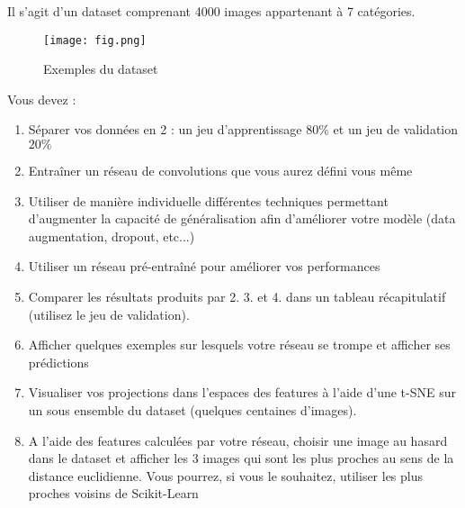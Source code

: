 \documentclass{article}
\begin{document}
Il s'agit d'un dataset comprenant 4000 images appartenant à 7 catégories.

\begin{figure}
    \centering
    \texttt{[image: fig.png]}
    \caption{Exemples du dataset}
    \label{fig:fig}
\end{figure}


Vous devez :

\begin{enumerate}
    \item Séparer vos données en 2 : un jeu d'apprentissage $80 \%$ et un jeu de validation $20 \%$

    \item Entraîner un réseau de convolutions que vous aurez défini vous même

    \item Utiliser de manière individuelle différentes techniques permettant d'augmenter la capacité de généralisation afin d'améliorer votre modèle (data augmentation, dropout, etc...)

    \item Utiliser un réseau pré-entraîné pour améliorer vos performances

    \item Comparer les résultats produits par 2. 3. et 4. dans un tableau récapitulatif (utilisez le jeu de validation).

    \item Afficher quelques exemples sur lesquels votre réseau se trompe et afficher ses prédictions

    \item Visualiser vos projections dans l'espaces des features à l'aide d'une t-SNE sur un sous ensemble du dataset (quelques centaines d'images).

    \item A l'aide des features calculées par votre réseau, choisir une image au hasard dans le dataset et afficher les 3 images qui sont les plus proches au sens de la distance euclidienne. Vous pourrez, si vous le souhaitez, utiliser les plus proches voisins de Scikit-Learn

\end{enumerate}
\end{document}
